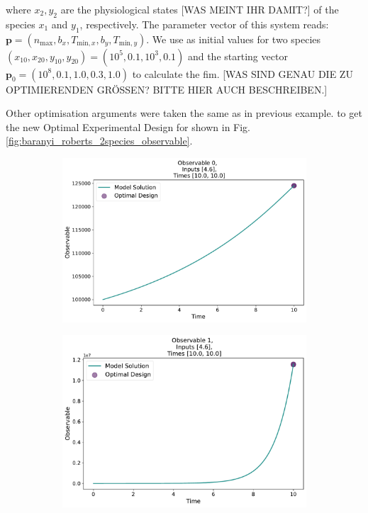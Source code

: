 \documentclass[10pt,A4paper]{article}
\newcommand{\mbp}{\mathbf{p}}
\begin{document}
where $x_2, y_2$ are the physiological states [WAS MEINT IHR DAMIT?] of the species $x_1$ and $y_1$, respectively. The parameter vector of this system reads: $\mbp = (n_\text{max}, b_x, T_{\text{min}, x}, b_y, T_{\text{min}, y})$. We use as initial values for two species $(x_{10}, x_{20}, y_{10}, y_{20}) = (10^5, 0.1, 10^3, 0.1)$ and the starting vector $\mbp_0= (10^8, 0.1, 1.0, 0.3, 1.0)$ to calculate the \ac{fim}. [WAS SIND GENAU DIE ZU OPTIMIERENDEN GRÖSSEN? BITTE HIER AUCH BESCHREIBEN.]

Other optimisation arguments were taken the same as in previous example. to get the new Optimal Experimental Design for shown in Fig. \ref{fig:baranyi_roberts_2species_observable}.
\begin{figure}[H]
    \begin{subfigure}{.9\textwidth}
        \centering
        \includegraphics[scale=0.35]{Figures/Observable_Results_baranyi_roberts_ode_fisher_determinant_2species_rel_sensit_cont_2times_2temps_000_x_00.pdf}
      \end{subfigure}    
      \begin{subfigure}{.9\textwidth}
        \centering
        \includegraphics[scale=0.35]{Figures/Observable_Results_baranyi_roberts_ode_fisher_determinant_2species_rel_sensit_cont_2times_2temps_000_x_01.pdf}
      \end{subfigure}
    \end{figure}%
\end{document}
